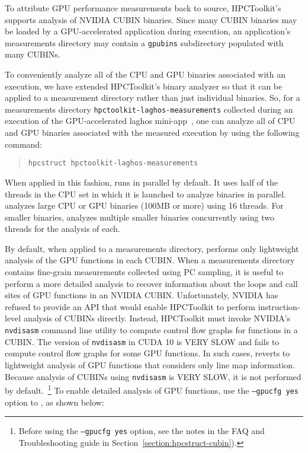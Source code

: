 To  attribute GPU performance measurements back to source, HPCToolkit's \hpcstruct{} supports analysis of NVIDIA CUBIN binaries. Since many CUBIN binaries may be loaded  by a GPU-accelerated application during execution, an application's measurements directory may contain a {\tt gpubins} subdirectory populated with many CUBINs. 

To conveniently analyze all of the CPU and GPU binaries associated with an execution,
we have extended HPCToolkit's \hpcstruct{} binary analyzer so that it can be applied to a measurement directory rather than just individual binaries. So, for a measurements directory {\tt hpctoolkit-laghos-measurements} collected during an execution of the GPU-accelerated laghos mini-app~\cite{laghos}, one can analyze all of CPU and GPU binaries associated with the measured execution by using the following command:

\begin{quote}
\begin{verbatim}
hpcstruct hpctoolkit-laghos-measurements
\end{verbatim}
\end{quote}

When applied in this fashion, \hpcstruct{} runs in parallel by default. It uses half of the threads in the CPU set in which it is launched to analyze binaries in parallel. \hpcstruct{}  analyzes large CPU or GPU binaries (100MB or more) using 16 threads. For smaller binaries,  \hpcstruct{} analyzes multiple smaller binaries concurrently using two threads for the analysis of each.

By default, when applied to a measurements directory, \hpcstruct{} performs only lightweight analysis of the GPU functions in each CUBIN. When a measurements directory contains fine-grain measurements collected using PC sampling, it is useful to perform a more detailed analysis to recover information about the loops and call sites of GPU functions in an NVIDIA CUBIN. Unfortunately, NVIDIA has refused to provide an API that would enable HPCToolkit to perform instruction-level analysis of CUBINs directly. Instead, HPCToolkit must invoke NVIDIA's {\tt nvdisasm} command line utility to compute control flow graphs for functions in a CUBIN. The version of {\tt nvdisasm} in CUDA 10 is VERY SLOW and fails to compute control flow graphs for some GPU functions. In such cases, \hpcstruct{} reverts to lightweight analysis of GPU functions that considers only line map information. Because analysis of CUBINs using {\tt nvdisasm} is VERY SLOW, it is not performed by default.~\footnote{Before using the {\tt --gpucfg yes} option, see the notes in the FAQ and Troubleshooting guide in Section~\ref{section:hpcstruct-cubin}).}  To enable detailed analysis of GPU functions, use the {\tt --gpucfg yes} option to \hpcstruct{}, as shown below:

